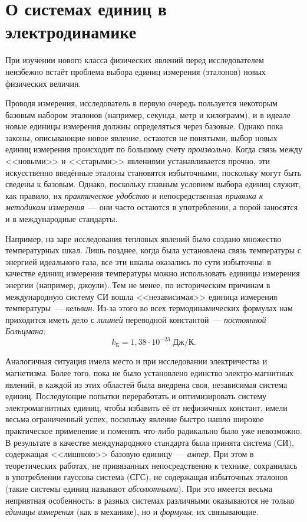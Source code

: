 \section*{О системах единиц в электродинамике}
\label{sec:app_units}

При изучении нового класса физических явлений перед исследователем
неизбежно встаёт проблема выбора единиц измерения (эталонов) новых
физических величин.

Проводя измерения, исследователь в первую очередь пользуется некоторым
базовым набором эталонов (например, секунда, метр и килограмм), и
в идеале новые единицы измерения должны определяться через базовые.
Однако пока законы, описывающие новое явление, остаются не понятыми,
выбор новых единиц измерения происходит по большому счету \emph{произвольно}.
Когда связь между <<новыми>> и <<старыми>>
явлениями устанавливается прочно, эти искусственно введённые эталоны
становятся избыточными, поскольку могут быть сведены к базовым. Однако,
поскольку главным условием выбора единиц служит, как правило,
их \emph{практическое удобство} и непосредственная
\emph{привязка к методикам измерения}~--- они часто остаются в употреблении,
а порой заносятся и в международные стандарты.

Например, на заре исследования тепловых явлений было создано множество
температурных шкал. Лишь позднее, когда была установлена связь температуры
с энергией идеального газа, все эти шкалы оказались по сути избыточны:
в качестве единиц измерения температуры можно использовать единицы
измерения энергии (например, джоули). Тем не менее, по историческим
причинам в международную систему СИ вошла <<независимая>>
единица измерения температуры~--- \emph{кельвин}. Из-за этого во
всех термодинамических формулах нам приходится иметь дело с \emph{лишней}
переводной константой~--- \emph{постоянной Больцмана}:
\[
k_{\text{Б}}=1{,}38\cdot10^{-23}\;\text{Дж}/\text{К}.
\]

Аналогичная ситуация имела место и при исследовании электричества
и магнетизма. Более того, пока не было установлено единство электро-магнитных
явлений, в каждой из этих областей была внедрена своя, независимая
система единиц. Последующие попытки переработать и оптимизировать
систему электромагнитных единиц, чтобы избавить её от нефизичных
констант, имели весьма ограниченный успех, поскольку явление быстро
нашло широкое практическое применение и поменять что-либо радикально
было уже невозможно. В результате в качестве международного стандарта
была принята система (СИ), содержащая <<лишнюю>>
базовую единицу~--- \emph{ампер}. При этом в теоретических работах,
не привязанных непосредственно к технике, сохранилась в употреблении
гауссова система (СГС), не содержащая избыточных эталонов (такие системы
единиц называют \emph{абсолютными}). При это имеется весьма неприятная
особенность: в разных системах различными оказываются не только \emph{единицы
измерения} (как в механике), но и \emph{формулы}, их связывающие.

